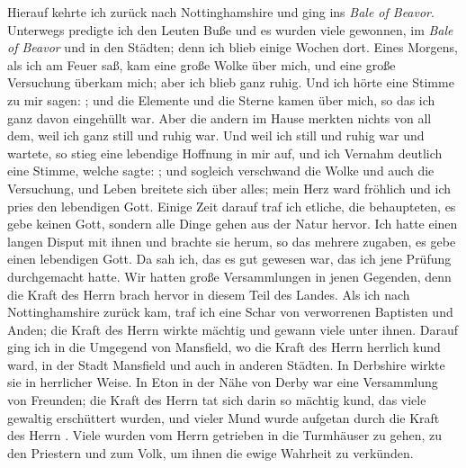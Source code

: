 Hierauf kehrte ich zurück nach Nottinghamshire und ging
ins \textit{Bale of Beavor}. Unterwegs predigte ich den Leuten Buße
und es wurden viele gewonnen, im \textit{Bale of Beavor} und in den
Städten; denn ich blieb einige Wochen dort. Eines Morgens,
als ich am Feuer saß, kam eine große Wolke über mich, und eine
große Versuchung überkam mich; aber ich 
blieb ganz ruhig. Und 
ich hörte eine Stimme zu mir sagen: ; und die Elemente und die Sterne kamen über
mich, so das ich ganz davon eingehüllt war. Aber die andern
im Hause merkten nichts von all dem, weil ich ganz still und
ruhig war. Und weil ich still und ruhig war und wartete, so
stieg eine lebendige Hoffnung in mir auf, und ich Vernahm deutlich
eine Stimme, welche sagte: ; und sogleich verschwand die Wolke
und auch die Versuchung, und Leben breitete sich über alles; mein
Herz ward fröhlich und ich pries den lebendigen Gott. Einige
Zeit darauf traf ich etliche, die behaupteten, es gebe keinen Gott,
sondern alle Dinge gehen aus der Natur hervor.
 Ich hatte einen
langen Disput mit ihnen und brachte sie herum, so das mehrere
zugaben, es gebe einen lebendigen Gott. Da sah ich, das es gut
gewesen war, das ich jene Prüfung durchgemacht hatte. Wir
hatten große Versammlungen in jenen Gegenden, denn die Kraft
des Herrn  brach hervor in diesem Teil des Landes. Als ich nach
Nottinghamshire zurück kam, traf ich eine Schar von verworrenen
Baptisten und Anden; die Kraft des Herrn  
wirkte mächtig und
gewann viele unter ihnen. Darauf ging ich in die Umgegend von
Mansfield, wo die Kraft des Herrn  herrlich kund ward, in der
Stadt Mansfield und auch in anderen Städten. 
In Derbshire
wirkte sie in herrlicher Weise. In Eton in der Nähe von Derby
war eine Versammlung von Freunden; die Kraft des Herrn  tat sich
darin so mächtig kund, das viele gewaltig erschüttert wurden, und
vieler Mund wurde aufgetan durch die Kraft des Herrn . Viele wurden
vom Herrn  getrieben in die Turmhäuser zu gehen, zu den Priestern
und zum Volk, um ihnen die ewige Wahrheit zu verkünden.


